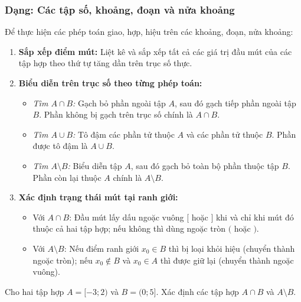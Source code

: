 \subsubsection{Dạng: Các tập số, khoảng, đoạn và nửa khoảng}
\begin{phuongphap}
Để thực hiện các phép toán giao, hợp, hiệu trên các khoảng, đoạn, nửa khoảng:
\begin{enumerate}
    \item \textbf{Sắp xếp điểm mút:} Liệt kê và sắp xếp tất cả các giá trị đầu mút của các tập hợp theo thứ tự tăng dần trên trục số thực.
    \item \textbf{Biểu diễn trên trục số theo từng phép toán:}
    \begin{itemize}
        \item \emph{Tìm $A \cap B$:} Gạch bỏ phần ngoài tập $A$, sau đó gạch tiếp phần ngoài tập $B$. Phần không bị gạch trên trục số chính là $A \cap B$.
        \item \emph{Tìm $A \cup B$:} Tô đậm các phần tử thuộc $A$ và các phần tử thuộc $B$. Phần được tô đậm là $A \cup B$.
        \item \emph{Tìm $A \setminus B$:} Biểu diễn tập $A$, sau đó gạch bỏ toàn bộ phần thuộc tập $B$. Phần còn lại thuộc $A$ chính là $A \setminus B$.
    \end{itemize}
    \item \textbf{Xác định trạng thái mút tại ranh giới:}
    \begin{itemize}
        \item Với $A \cap B$: Đầu mút lấy dấu ngoặc vuông $[$ hoặc $]$ khi và chỉ khi mút đó thuộc cả hai tập hợp; nếu không thì dùng ngoặc tròn $($ hoặc $)$.
        \item Với $A \setminus B$: Nếu điểm ranh giới $x_0 \in B$ thì bị loại khỏi hiệu (chuyển thành ngoặc tròn); nếu $x_0 \notin B$ và $x_0 \in A$ thì được giữ lại (chuyển thành ngoặc vuông).
    \end{itemize}
\end{enumerate}
\end{phuongphap}

\begin{vidumau}
Cho hai tập hợp $A = [-3; 2)$ và $B = (0; 5]$. Xác định các tập hợp $A \cap B$ và $A \setminus B$.
\end{vidumau}

